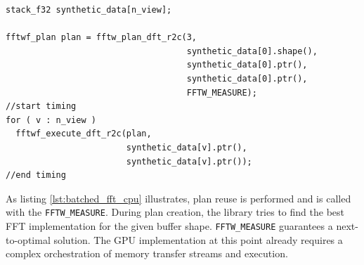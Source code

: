 \begin{lstlisting}[caption={Batched FFT on synthetic data performed on CPU in pseudo-code based on the \fftw{} syntax.},label={lst:batched_fft_cpu}]
stack_f32 synthetic_data[n_view];

fftwf_plan plan = fftw_plan_dft_r2c(3,
                                    synthetic_data[0].shape(),
                                    synthetic_data[0].ptr(),
                                    synthetic_data[0].ptr(),
                                    FFTW_MEASURE);
//start timing
for ( v : n_view )
  fftwf_execute_dft_r2c(plan, 
                        synthetic_data[v].ptr(),
                        synthetic_data[v].ptr());
//end timing
\end{lstlisting}

As listing \ref{lst:batched_fft_cpu} illustrates, plan reuse is performed and \fftw{} is called with the \texttt{FFTW\_MEASURE}. During plan creation, the \fftw{} library tries to find the best FFT implementation for the given buffer shape. \texttt{FFTW\_MEASURE} guarantees a next-to-optimal solution. The GPU implementation at this point already requires a complex orchestration of memory transfer streams and execution.

